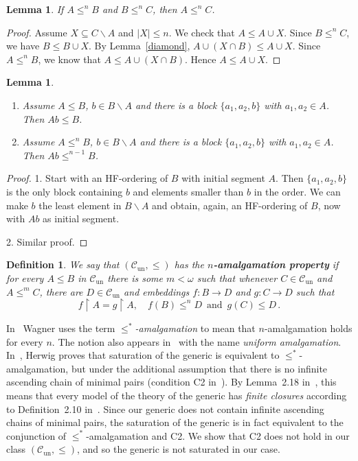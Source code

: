 \documentclass[a4paper, 11pt]{article}
\newcommand{\Cun}{\mathcal{C}_\mathrm{un}}
\theoremstyle{note}
\newtheorem{lemma}[thm]{Lemma}
\newtheorem{df}[thm]{Definition}
\begin{document}
\begin{lemma}\label{sat3}  If  $A\leq^n B$ and $B\leq^n C$, then $A\leq^n C$.
\end{lemma}
\begin{proof}  Assume $X\subseteq C \smallsetminus A$  and $|X|\leq n$. We check that  $A\leq A\cup X$. Since $B\leq^n C$, we have $B\leq B\cup X$. By Lemma~\ref{diamond},   $A\cup (X\cap B)\leq A\cup X$.
	Since $A\leq^n B$, we know that $A\leq A\cup (X\cap B)$.  Hence  $A\leq A\cup X$.
\end{proof}
	

	
\begin{lemma}\label{Feb_23_2024_1}\begin{enumerate}
			\item Assume $A\leq B$, $ b\in B\smallsetminus A$ and there is a block $\{a_1,a_2,b\}$  with  $a_1,a_2\in A$. Then  $Ab\leq B$.
			\item Assume $A\leq^n B$, $b\in B\smallsetminus A$ and there is a block $\{a_1,a_2,b\}$  with  $a_1,a_2\in A$. Then  $Ab\leq^{n-1} B$.
		\end{enumerate}
	\end{lemma}
	\begin{proof} 1.  Start with an HF-ordering of $B$ with initial segment $A$. Then $\{a_1,a_2,b\}$ is the only block containing $b$ and elements  smaller than $b$ in the order.  We can make $b$ the least element in $B\smallsetminus A$ and obtain, again, an HF-ordering of $B$, now with $Ab$ as initial segment. 
		
		2. Similar proof.
	\end{proof}
	
\begin{df}
	We say that $(\Cun, \leq)$  has the \textbf{$n$-amalgamation property} if  for every $A\leq B$ in $\Cun$ there is some $m<\omega$  such that whenever $C\in \Cun$ and $A\leq^m C$, there are $D\in \Cun$ and embeddings $f:B\rightarrow D$ and $g:C\rightarrow D$   such that 
$$ f\restriction A= g\restriction A, \quad f(B)\leq^n D \, \mbox{ and } \, g(C)\leq D \, .$$
\end{df}

In~\cite{wagner} Wagner uses the term \textit{$\leq^\ast$-amalgamation} to mean that $n$-amalgamation holds for every $n$. The notion also appears in~\cite{baldwin-shi} with the name \textit{uniform amalgamation}. In~\cite{herwig}, Herwig proves that saturation of the generic is equivalent to $\leq^\ast$-amalgamation, but under the additional assumption that there is no infinite ascending chain of minimal pairs (condition C2 in~\cite{wagner}). By Lemma~2.18 in~\cite{baldwin-shi}, this means 
 that every model of the theory of the generic has \textit{finite closures} according to Definition~2.10 in~\cite{baldwin-shi}. Since our generic does not contain infinite ascending chains of minimal pairs, the saturation of the generic is in fact equivalent to the conjunction of $\leq^\ast$-amalgamation and C2. We show that C2 does not hold in our class $(\Cun,\leq)$, and so the generic is not saturated in our case.
\end{document}
